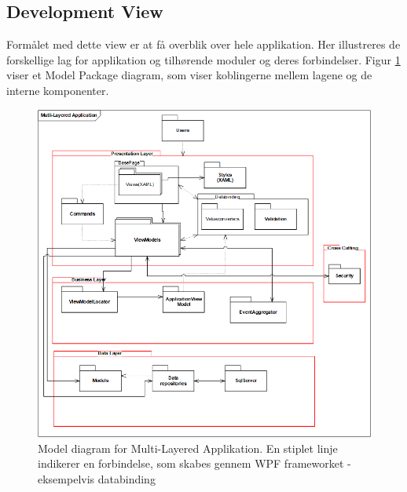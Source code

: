 \documentclass[Rapport/Rapport_main.tex]{subfiles}
\begin{document}
\subsection{Development View}
Formålet med dette view er at få overblik over hele applikation. Her illustreres de forskellige lag for applikation og tilhørende moduler og deres forbindelser. Figur \ref{fig:PackageDiagram} viser et Model Package diagram, som viser koblingerne mellem lagene og de interne komponenter. 
\begin{figure}[H]
    \centering
    \includegraphics[width=\textwidth]{Arkitektur/4+1View/Graphics/PackageDiagram.png}
    \caption{Model diagram for Multi-Layered Applikation. En stiplet linje indikerer en forbindelse, som skabes gennem WPF frameworket - eksempelvis databinding}
    \label{fig:PackageDiagram}
\end{figure}
\end{document}
